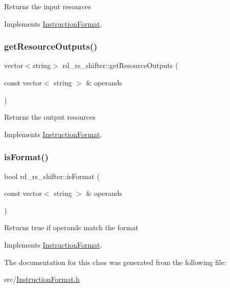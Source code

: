 Returns the input resources 

Implements \hyperlink{classInstructionFormat_a09775d3a3c22f40a0f44504664e586e4}{Instruction\+Format}.

\mbox{\label{classrd__rs__shifter_aed7186be3ead5fe24d6d63eacdf817bd}} 
\subsubsection{\texorpdfstring{get\+Resource\+Outputs()}{getResourceOutputs()}}
{\footnotesize\ttfamily vector$<$string$>$ rd\+\_\+rs\+\_\+shifter\+::get\+Resource\+Outputs (\begin{DoxyParamCaption}\item[{const vector$<$ string $>$ \&}]{operands }\end{DoxyParamCaption})\hspace{0.3cm}{\ttfamily [virtual]}}

Returns the output resources 

Implements \hyperlink{classInstructionFormat_a95cd28ffb1bde59b67f676880ab10536}{Instruction\+Format}.

\mbox{\label{classrd__rs__shifter_a78e9526cc76d33f8dbfe614733ee3564}} 
\subsubsection{\texorpdfstring{is\+Format()}{isFormat()}}
{\footnotesize\ttfamily bool rd\+\_\+rs\+\_\+shifter\+::is\+Format (\begin{DoxyParamCaption}\item[{const vector$<$ string $>$ \&}]{operands }\end{DoxyParamCaption})\hspace{0.3cm}{\ttfamily [virtual]}}

Returns true if operands match the format 

Implements \hyperlink{classInstructionFormat_a9fdcf94dcd7d9a55ba86e7a63f04d1fe}{Instruction\+Format}.



The documentation for this class was generated from the following file\+:\begin{DoxyCompactItemize}
\item 
src/\hyperlink{InstructionFormat_8h}{Instruction\+Format.\+h}\end{DoxyCompactItemize}
